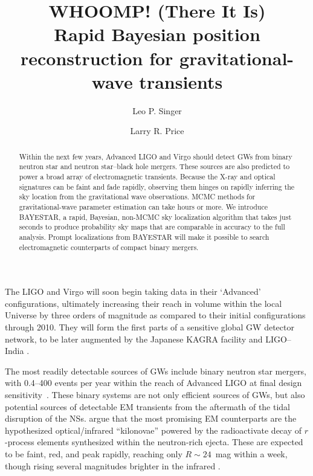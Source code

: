 \documentclass[amsmath,amssymb,aps,prx,reprint,nopreprintnumbers,nofootinbib]{revtex4-1}
\begin{document}
\title[Rapid-response Bayesian sky localization]{WHOOMP! (There It Is) \\
Rapid Bayesian position reconstruction for gravitational\nobreakdashes-wave transients}
\author{Leo P. Singer}
\author{Larry R. Price}

\begin{abstract}
Within the next few years, Advanced LIGO and Virgo should detect \acp{GW} from binary neutron star and neutron star\nobreakdashes--black hole mergers. These sources are also predicted to power a broad array of electromagnetic transients. Because the X\nobreakdashes-ray and optical signatures can be faint and fade rapidly, observing them hinges on rapidly inferring the sky location from the gravitational wave observations. \ac{MCMC} methods for gravitational\nobreakdashes-wave parameter estimation can take hours or more. We introduce BAYESTAR, a rapid, Bayesian, non-\ac{MCMC} sky localization algorithm that takes just seconds to produce probability sky maps that are comparable in accuracy to the full analysis. Prompt localizations from BAYESTAR will make it possible to search electromagnetic counterparts of compact binary mergers.
\end{abstract}

\maketitle

The \acf{LIGO} and Virgo will soon begin taking data \cite{LIGOObservingScenarios} in their `Advanced' configurations, ultimately increasing their reach in volume within the local Universe by three orders of magnitude as compared to their initial configurations through 2010. They will form the first parts of a sensitive global \ac{GW} detector network, to be later augmented by the Japanese KAGRA facility \cite{LCGT,KAGRAInterferometerDesign} and \ac{LIGO}\nobreakdashes--India \cite{LIGOIndia}.

The most readily detectable sources of \acp{GW} include binary neutron star mergers, with 0.4\nobreakdashes--400 events per year within the reach of Advanced LIGO at final design sensitivity~\cite{rates}. These binary systems are not only efficient sources of \acp{GW}, but also potential sources of detectable \ac{EM} transients from the aftermath of the tidal disruption of the \acp{NS}. \citet{MostPromisingEMCounterpart} argue that the most promising \ac{EM} counterparts are the hypothesized optical/infrared ``kilonovae'' powered by the radioactivate decay of $r$\nobreakdashes-process elements synthesized within the neutron\nobreakdashes-rich ejecta. These are expected to be faint, red, and peak rapidly, reaching only $R \sim 24$~mag within a week, though rising several magnitudes brighter in the infrared \citep{KilonovaHighOpacities}.
\end{document}
